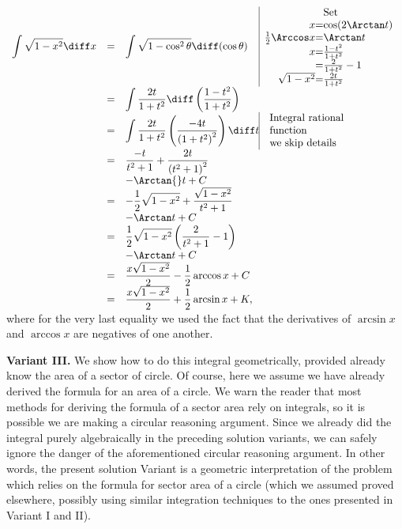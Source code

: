 {$
\begin{array}{rcl@{}l@{}|l}
\displaystyle \int \sqrt{1-x^2}\diff x &=&\displaystyle  \int \sqrt{1-\cos^2\theta}\diff (\cos \theta) &&\begin{array}{@{}r@{}c@{}l} &&\text{Set }\\
x&=&\cos(2\Arctan t)\\
\frac{1}{2}\Arccos x&=&\Arctan t\\ 
x&=&\frac{1-t^2}{1+t^2}\\
&=& \frac{2}{1+t^2}-1\\
\sqrt{1-x^2}&=&\frac{2t}{1+t^2}\\
\end{array}\\
&=&\displaystyle \int \frac{2t}{1+t^2}\diff \left(\frac{1-t^2}{1+t^2} \right) \\
&=&\displaystyle \int \frac{2t}{1+t^2} \left(\frac{-4t}{\left(1+t^2\right)^2}\right)\diff t &&\begin{array}{l}
\text{Integral rational}\\
\text{function}\\
\text{we skip details}
\end{array} \\
&=&\displaystyle \frac{-t}{t^{2}+1}+\frac{2 t}{ \left(t^{2}+1\right)^{2}}\\
&&\displaystyle - \Arctan{}t+C \\
&=&\displaystyle -\frac{1}{2}\sqrt{1-x^2} +\frac{\sqrt{1-x^2}}{t^2+1} \\
&&- \Arctan t+C\\
&=&\displaystyle \frac{1}{2} \sqrt{1-x^2} \left(\frac{ 2}{ t^2 +1} -1\right)\\
&&-\Arctan t+C\\
&=&\displaystyle \frac{x\sqrt{1-x^2}}{2}-\frac{1}{2}\arccos x+C\\
&=&\displaystyle \frac{x\sqrt{1-x^2}}{2}+\frac{1}{2}\arcsin x+K,
\end{array}
$
where for the very last equality we used the fact that the derivatives of $\arcsin x$ and $\arccos x$ are negatives of one another.

\textbf{Variant III. } We show how to do this integral geometrically, provided already know the area of a sector of circle. Of course, here we assume we have already derived the formula for an area of a circle. We warn the reader that most methods for deriving the formula of a sector area rely on integrals, so it is possible we are making a circular reasoning argument. Since we already did the integral purely algebraically in the preceding solution variants, we can safely ignore the danger of the aforementioned circular reasoning argument. In other words, the present solution Variant is a geometric interpretation of the problem which relies on the formula for sector area of a circle (which we assumed proved elsewhere, possibly using similar integration techniques to the ones presented in Variant I and II).

}
